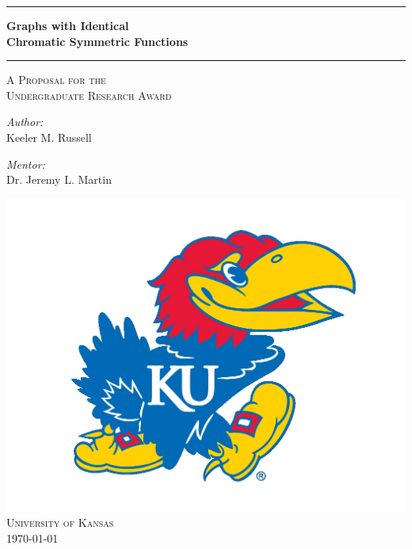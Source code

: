 \documentclass[a4paper,12pt]{article}
\begin{document}
\begin{titlepage}
\begin{center}
\vspace*{4cm}

\hrule
\vspace{0.4cm} 
{\LARGE \bfseries Graphs with Identical }\\[1mm]
{\LARGE \bfseries Chromatic Symmetric Functions}\\[0.4cm]
\hrule
\vspace{1.2cm}

\textsc{\Large A Proposal for the}\\[0.2cm]
\textsc{\Large Undergraduate Research Award}\\[2cm]

\begin{minipage}{0.4\textwidth}
\begin{flushleft} \large
\hspace{1cm}\emph{Author:}\\
Keeler M. Russell
\end{flushleft}
\end{minipage}
\begin{minipage}{0.4\textwidth}
\begin{flushright} \large
\emph{Mentor:}\ \ \ \ \ \ \ \ \ \ \ \\
Dr. Jeremy L. Martin
\end{flushright}
\end{minipage}
\vspace{3cm}

\vfill
\includegraphics[scale=0.15]{./figures/kujayhawk.png}\\
\textsc{University of Kansas}\\[0.75cm]
{\large \today}
\end{center}
\end{titlepage}
\end{document}
